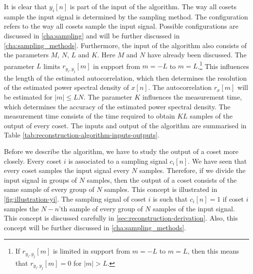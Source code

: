 \documentclass[a4paper, openany, oneside]{memoir}
\begin{document}
It is clear that $y_i[n]$ is part of the input of the algorithm. The way all cosets sample the input signal is determined by the sampling method. The configuration refers to the way all cosets sample the input signal. Possible configurations are discussed in \ref{cha:sampling} and will be further discussed in \ref{cha:sampling_methods}. Furthermore, the input of the algorithm also consists of the parameters $M$, $N$, $L$ and $K$. Here $M$ and $N$ have already been discussed. The parameter $L$ limits $r_{y_i,y_j}[m]$ in support from $m=-L$ to $m=L$.\footnote{If $r_{y_i,y_j}[m]$ is limited in support from $m=-L$ to $m=L$, then this means that $r_{y_i,y_j}[m]=0$ for $|m|>L$.} This influences the length of the estimated autocorrelation, which then determines the resolution of the estimated power spectral density of $x[n]$. The autocorrelation $r_x[m]$ will be estimated for $|m| \le LN$. The parameter $K$ influences the measurement time, which determines the accuracy of the estimated power spectral density. The measurement time consists of the time required to obtain $KL$ samples of the output of every coset. The inputs and output of the algorithm are summarised in Table \ref{tab:reconstruction-algorithm-inputs-outputs}.

Before we describe the algorithm, we have to study the output of a coset more closely. Every coset $i$ is associated to a sampling signal $c_i[n]$. We have seen that every coset samples the input signal every $N$ samples. Therefore, if we divide the input signal in groups of $N$ samples, then the output of a coset consists of the same sample of every group of $N$ samples. This concept is illustrated in \cref{fig:illustration-yi}. The sampling signal of coset $i$ is such that $c_i[n]=1$ if coset $i$ samples the $N-n$'th sample of every group of $N$ samples of the input signal. This concept is discussed carefully in \cref{sec:reconstruction-derivation}. Also, this concept will be further discussed in \cref{cha:sampling_methods}.
\end{document}
